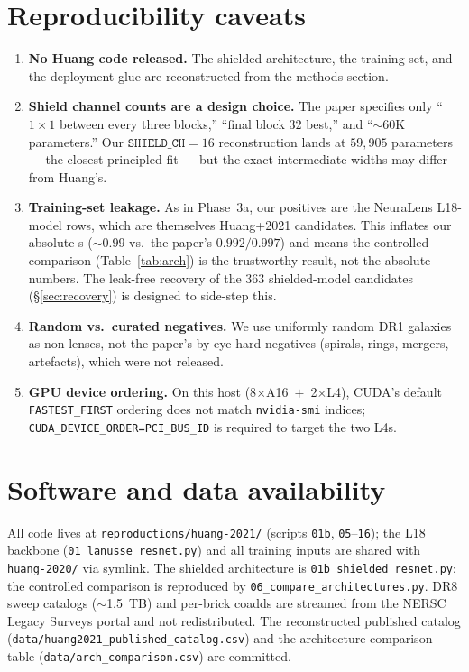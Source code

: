 \documentclass[11pt,letterpaper]{article}
\begin{document}
\section{Reproducibility caveats}
\label{sec:caveats}

\begin{enumerate}
\item \textbf{No Huang code released.} The shielded architecture, the training
set, and the deployment glue are reconstructed from the methods section.
\item \textbf{Shield channel counts are a design choice.} The paper specifies
only ``$1{\times}1$ between every three blocks,'' ``final block $32$ best,'' and
``$\sim$60K parameters.'' Our $\mathtt{SHIELD\_CH}=16$ reconstruction lands at
$59{,}905$ parameters --- the closest principled fit --- but the exact
intermediate widths may differ from Huang's.
\item \textbf{Training-set leakage.} As in Phase~3a, our positives are the
NeuraLens L18-model rows, which are themselves Huang+2021 candidates. This
inflates our absolute \AUC{}s ($\sim$0.99 vs.\ the paper's $0.992/0.997$) and
means the controlled comparison (Table~\ref{tab:arch}) is the trustworthy
result, not the absolute numbers. The leak-free recovery of the $363$
shielded-model candidates (\S\ref{sec:recovery}) is designed to side-step this.
\item \textbf{Random vs.\ curated negatives.} We use uniformly random DR1
galaxies as non-lenses, not the paper's by-eye hard negatives (spirals, rings,
mergers, artefacts), which were not released.
\item \textbf{GPU device ordering.} On this host (8$\times$A16~$+$~2$\times$L4),
CUDA's default \texttt{FASTEST\_FIRST} ordering does not match \texttt{nvidia-smi}
indices; \texttt{CUDA\_DEVICE\_ORDER=PCI\_BUS\_ID} is required to target the two
L4s.
\end{enumerate}

\section{Software and data availability}

All code lives at \texttt{reproductions/huang-2021/} (scripts \texttt{01b},
\texttt{05}--\texttt{16}); the L18 backbone (\texttt{01\_lanusse\_resnet.py}) and
all training inputs are shared with \texttt{huang-2020/} via symlink. The
shielded architecture is \texttt{01b\_shielded\_resnet.py}; the controlled
comparison is reproduced by \texttt{06\_compare\_architectures.py}. DR8 sweep
catalogs ($\sim$1.5~TB) and per-brick coadds are streamed from the NERSC Legacy
Surveys portal and not redistributed. The reconstructed published catalog
(\texttt{data/huang2021\_published\_catalog.csv}) and the architecture-comparison
table (\texttt{data/arch\_comparison.csv}) are committed.
\end{document}
